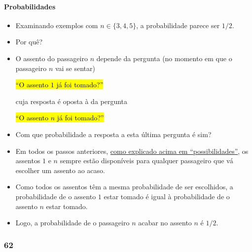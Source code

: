 \documentclass[
  11pt]{report}
\begin{document}
\hypertarget{probabilidades}{%
\paragraph*{Probabilidades}\label{probabilidades}}

\begin{itemize}
\item
  Examinando exemplos com $n \in \{3, 4, 5\}$, a probabilidade parece ser $1/2$.
\item
  Por quê?
\item
  O assento do passageiro $n$ depende da pergunta (no momento em que o passageiro $n$ vai se sentar)

  {\hl{``O assento $1$ já foi tomado?''}}

  cuja resposta é oposta à da pergunta

  {\hl{``O assento $n$ já foi tomado?''}}
\item
  Com que probabilidade a resposta a esta última pergunta é sim?
\item
  Em todos os passos anteriores, \protect\hyperlink{possibilidades}{como explicado acima em ``possibilidades''}, os assentos $1$ e $n$ sempre estão disponíveis para qualquer passageiro que vá escolher um assento ao acaso.
\item
  Como todos os assentos têm a mesma probabilidade de ser escolhidos, a probabilidade de o assento $1$ estar tomado é igual à probabilidade de o assento $n$ estar tomado.
\item
  Logo, a probabilidade de o passageiro $n$ acabar no assento $n$ é $1/2$.
\end{itemize}

\hypertarget{section-9}{%
\subsubsection*{62}\label{section-9}}
\end{document}
